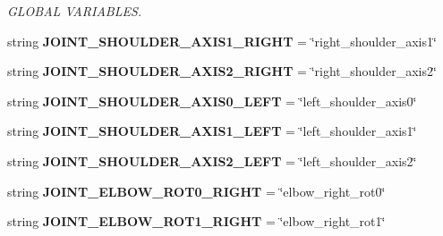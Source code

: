 \begin{DoxyCompactItemize}
\begin{DoxyCompactList}\small\item\em G\+L\+O\+B\+AL V\+A\+R\+I\+A\+B\+L\+ES. \end{DoxyCompactList}\item 
\mbox{\label{namespacedoxytest_acf1973ead16f478d0581cbd10450e4cb}} 
string {\bfseries J\+O\+I\+N\+T\+\_\+\+S\+H\+O\+U\+L\+D\+E\+R\+\_\+\+A\+X\+I\+S1\+\_\+\+R\+I\+G\+HT} = \char`\"{}right\+\_\+shoulder\+\_\+axis1\char`\"{}
\item 
\mbox{\label{namespacedoxytest_a1dac0e6cd1c4cd2bceea06236c02f061}} 
string {\bfseries J\+O\+I\+N\+T\+\_\+\+S\+H\+O\+U\+L\+D\+E\+R\+\_\+\+A\+X\+I\+S2\+\_\+\+R\+I\+G\+HT} = \char`\"{}right\+\_\+shoulder\+\_\+axis2\char`\"{}
\item 
\mbox{\label{namespacedoxytest_a52376c6430d520bd8b246fecb1dff500}} 
string {\bfseries J\+O\+I\+N\+T\+\_\+\+S\+H\+O\+U\+L\+D\+E\+R\+\_\+\+A\+X\+I\+S0\+\_\+\+L\+E\+FT} = \char`\"{}left\+\_\+shoulder\+\_\+axis0\char`\"{}
\item 
\mbox{\label{namespacedoxytest_ab8b2b84d71c01cad31a6df1098c1e4af}} 
string {\bfseries J\+O\+I\+N\+T\+\_\+\+S\+H\+O\+U\+L\+D\+E\+R\+\_\+\+A\+X\+I\+S1\+\_\+\+L\+E\+FT} = \char`\"{}left\+\_\+shoulder\+\_\+axis1\char`\"{}
\item 
\mbox{\label{namespacedoxytest_a290954417f1babc1b675bedcd7ad1dad}} 
string {\bfseries J\+O\+I\+N\+T\+\_\+\+S\+H\+O\+U\+L\+D\+E\+R\+\_\+\+A\+X\+I\+S2\+\_\+\+L\+E\+FT} = \char`\"{}left\+\_\+shoulder\+\_\+axis2\char`\"{}
\item 
\mbox{\label{namespacedoxytest_a2bfbf11888738eeba4672413951ee620}} 
string {\bfseries J\+O\+I\+N\+T\+\_\+\+E\+L\+B\+O\+W\+\_\+\+R\+O\+T0\+\_\+\+R\+I\+G\+HT} = \char`\"{}elbow\+\_\+right\+\_\+rot0\char`\"{}
\item 
\mbox{\label{namespacedoxytest_a808ea931fd356b8c6cbabd69521f5b80}} 
string {\bfseries J\+O\+I\+N\+T\+\_\+\+E\+L\+B\+O\+W\+\_\+\+R\+O\+T1\+\_\+\+R\+I\+G\+HT} = \char`\"{}elbow\+\_\+right\+\_\+rot1\char`\"{}
\item 
\mbox{\label{namespacedoxytest_a2bdc6c51370c9a96a03aced9313cf8e7}} 

\end{DoxyCompactItemize}
